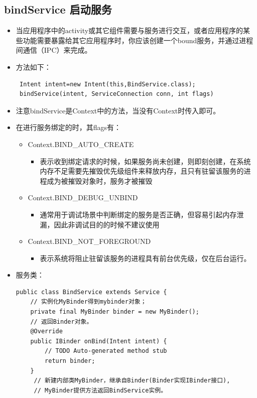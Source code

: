 \documentclass[9pt, b5paper]{article}
\begin{document}
\subsection{bindService 启动服务　　}
\label{sec-3-7}
\begin{itemize}
\item 当应用程序中的activity或其它组件需要与服务进行交互，或者应用程序的某些功能需要暴露给其它应用程序时，你应该创建一个bound服务，并通过进程间通信（IPC）来完成。
\item 方法如下：
\begin{verbatim}
 Intent intent=new Intent(this,BindService.class); 
 bindService(intent, ServiceConnection conn, int flags)
\end{verbatim}
\item 注意bindService是Context中的方法，当没有Context时传入即可。
\item 在进行服务绑定的时，其flags有：
\begin{itemize}
\item Context.BIND\_AUTO\_CREATE    
\begin{itemize}
\item 表示收到绑定请求的时候，如果服务尚未创建，则即刻创建，在系统内存不足需要先摧毁优先级组件来释放内存，且只有驻留该服务的进程成为被摧毁对象时，服务才被摧毁　
\end{itemize}
\item Context.BIND\_DEBUG\_UNBIND    　
\begin{itemize}
\item 通常用于调试场景中判断绑定的服务是否正确，但容易引起内存泄漏，因此非调试目的的时候不建议使用
\end{itemize}
\item Context.BIND\_NOT\_FOREGROUND    　
\begin{itemize}
\item 表示系统将阻止驻留该服务的进程具有前台优先级，仅在后台运行。
\end{itemize}
\end{itemize}
\item 服务类：
\begin{verbatim}
public class BindService extends Service {
    // 实例化MyBinder得到mybinder对象；
    private final MyBinder binder = new MyBinder();
    // 返回Binder对象。
    @Override
    public IBinder onBind(Intent intent) {
        // TODO Auto-generated method stub
        return binder;
    }
     // 新建内部类MyBinder，继承自Binder(Binder实现IBinder接口),
     // MyBinder提供方法返回BindService实例。

\end{verbatim}
\end{itemize}
\end{document}
